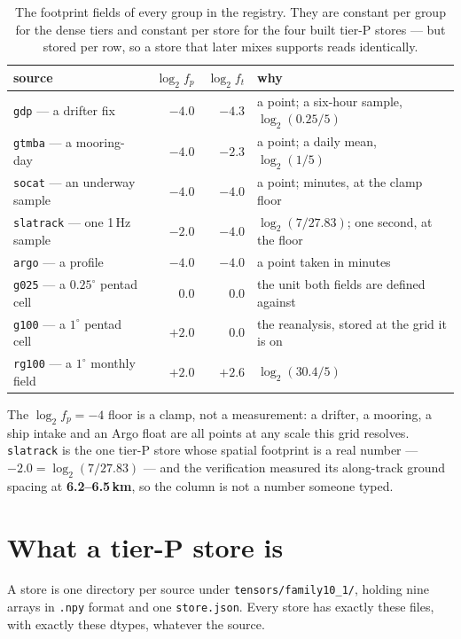 \documentclass[10pt]{article}
\newcommand{\code}[1]{\texttt{#1}}
\begin{document}
\begin{table}[h]
\centering\footnotesize
\begin{tabular}{@{}lrrl@{}}
\toprule
source & $\log_2 f_p$ & $\log_2 f_t$ & why \\
\midrule
\code{gdp} --- a drifter fix              & $-4.0$ & $-4.3$ & a point; a six-hour sample, $\log_2(0.25/5)$ \\
\code{gtmba} --- a mooring-day            & $-4.0$ & $-2.3$ & a point; a daily mean, $\log_2(1/5)$ \\
\code{socat} --- an underway sample       & $-4.0$ & $-4.0$ & a point; minutes, at the clamp floor \\
\code{slatrack} --- one 1\,Hz sample      & $-2.0$ & $-4.0$ & $\log_2(7/27.83)$; one second, at the floor \\
\code{argo} --- a profile                 & $-4.0$ & $-4.0$ & a point taken in minutes \\
\code{g025} --- a $0.25^\circ$ pentad cell & $0.0$  & $0.0$  & the unit both fields are defined against \\
\code{g100} --- a $1^\circ$ pentad cell   & $+2.0$ & $0.0$  & the reanalysis, stored at the grid it is on \\
\code{rg100} --- a $1^\circ$ monthly field & $+2.0$ & $+2.6$ & $\log_2(30.4/5)$ \\
\bottomrule
\end{tabular}
\caption{The footprint fields of every group in the registry. They are constant
per group for the dense tiers and constant per store for the four built tier-P
stores --- but stored per row, so a store that later mixes supports reads
identically.}
\end{table}

The $\log_2 f_p = -4$ floor is a clamp, not a measurement: a drifter, a
mooring, a ship intake and an Argo float are all points at any scale this grid
resolves. \code{slatrack} is the one tier-P store whose spatial footprint is a
real number --- $-2.0 = \log_2(7/27.83)$ --- and the verification measured its
along-track ground spacing at \textbf{6.2--6.5\,km}, so the column is not a
number someone typed.

\section{What a tier-P store is}

A store is one directory per source under \code{tensors/family10\_1/}, holding
nine arrays in \code{.npy} format and one \code{store.json}. Every store has
exactly these files, with exactly these dtypes, whatever the source.
\end{document}

